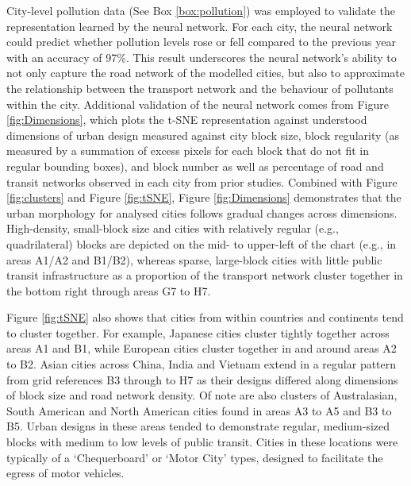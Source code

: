 \documentclass[preprint,10pt]{elsarticle} %
\begin{document}
City-level pollution data (See Box \ref{box:pollution}) was employed to validate the representation learned by the neural network. For each city, the neural network could predict whether pollution levels rose or fell compared to the previous year with an accuracy of 97\%. This result underscores the neural network's ability to not only capture the road network of the modelled cities, but also to approximate the relationship between the transport network and the behaviour of pollutants within the city. Additional validation of the neural network comes from Figure \ref{fig:Dimensions}, which plots the t-SNE representation against understood dimensions of urban design measured against city block size, block regularity (as measured by a summation of excess pixels for each block that do not fit in regular bounding boxes), and block number as well as percentage of road and transit networks observed in each city from prior studies\cite{Thompson2020,Nice2019b}. Combined with Figure \ref{fig:clusters} and Figure \ref{fig:tSNE}, Figure \ref{fig:Dimensions} demonstrates that the urban morphology for analysed cities follows gradual changes across dimensions. High-density, small-block size and cities with relatively regular (e.g., quadrilateral) blocks are depicted on the mid- to upper-left of the chart (e.g., in areas A1/A2 and B1/B2), whereas sparse, large-block cities with little public transit infrastructure as a proportion of the transport network cluster together in the bottom right through areas G7 to H7. 

Figure \ref{fig:tSNE} also shows that cities from within countries and continents tend to cluster together. For example, Japanese cities cluster tightly together across areas A1 and B1, while European cities cluster together in and around areas A2 to B2. Asian cities across China, India and Vietnam extend in a regular pattern from grid references B3 through to H7 as their designs differed along dimensions of block size and road network density. Of note are also clusters of Australasian, South American and North American cities found in areas A3 to A5 and B3 to B5. Urban designs in these areas tended to demonstrate regular, medium-sized blocks with medium to low levels of public transit. Cities in these locations were typically of a `Chequerboard' or `Motor City' types, designed to facilitate the egress of motor vehicles.
\end{document}
